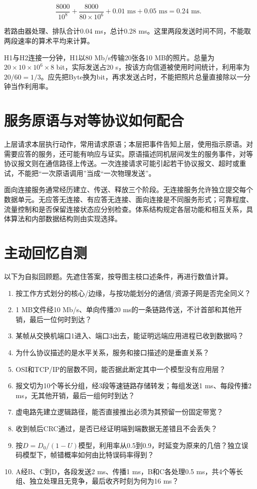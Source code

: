 \[\frac{8000}{10^8}+\frac{8000}{80\times10^6}+0.01\text{ ms}+0.05\text{ ms}=0.24\text{ ms}.\]

若路由器处理、排队合计0.04 ms，总计0.28 ms。这里两段发送时间不同，不能取两段速率的算术平均来计算。

H1与H2连接一分钟，H1以80 Mb/s传输20张各10 MB的照片。总量为\(20\times10\times10^6\times8\) bit，实际发送占20 s，按该方向信道被使用时间统计，利用率为\(20/60=1/3\)。应先把Byte换为bit，再求发送占时，不能把照片总量直接除以一分钟当作利用率。

\section{服务原语与对等协议如何配合}\label{CN01-course-primitives}

上层请求本层执行动作，常用请求原语；本层把事件告知上层，使用指示原语。对需要应答的服务，还可能有响应与证实。原语描述同机层间发生的服务事件，对等协议报文则在通信路径上传送。一次连接请求可能引起若干协议报文、超时或重试，不能把``一次原语调用''当成``一次物理发送''。

面向连接服务通常经历建立、传送、释放三个阶段。无连接服务允许独立提交每个数据单元。无应答无连接、有应答无连接、面向连接是不同服务形式；可靠程度、流量控制和是否保留连接状态应分别检查。体系结构规定各层功能和相互关系，具体算法和内部数据结构则由实现选择。

\section{主动回忆自测}\label{CN01-review}

以下为自拟回顾题。先遮住答案，按导图主枝口述条件，再进行数值计算。

\begin{enumerate}
\def\labelenumi{\arabic{enumi}.}
\item
  按工作方式划分的核心/边缘，与按功能划分的通信/资源子网是否完全同义？
\item
  1 MB文件经10 Mb/s、单向传播20 ms的一条链路传送，不计首部和其他开销，最后一位何时到达？
\item
  某帧从交换机端口1进入、端口3出去，能证明远端应用进程已收到数据吗？
\item
  为什么协议描述的是水平关系，服务和接口描述的是垂直关系？
\item
  OSI和TCP/IP的层数不同，能否据此断定其中一个模型没有应用层？
\item
  报文切为10个等长分组，经3段等速链路存储转发；每组发送1 ms、每段传播2 ms，无其他开销，最后一组何时到达？
\item
  虚电路先建立逻辑路径，能否直接推出必须为其预留一份固定带宽？
\item
  收到帧后CRC通过，是否已经证明端到端数据无差错且不会丢失？
\item
  按\(D=D_0/(1-U)\)模型，利用率从0.5到0.9，时延变为原来的几倍？独立误码模型下，帧错概率如何由比特误码率得到？
\item
  A经B、C到D，各段发送2 ms、传播1 ms，B和C各处理0.5 ms，共4个等长组、独立处理且无竞争，最后收齐时刻为何为16 ms？
\end{enumerate}

